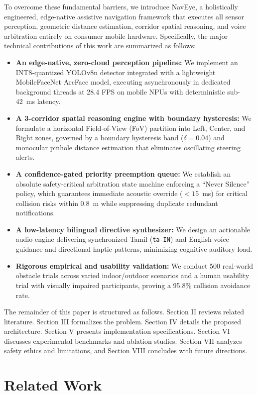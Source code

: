 \documentclass[conference]{IEEEtran}
\begin{document}
To overcome these fundamental barriers, we introduce NavEye, a holistically engineered, edge-native assistive navigation framework that executes all sensor perception, geometric distance estimation, corridor spatial reasoning, and voice arbitration entirely on consumer mobile hardware. Specifically, the major technical contributions of this work are summarized as follows:
\begin{itemize}
    \item \textbf{An edge-native, zero-cloud perception pipeline:} We implement an INT8-quantized YOLOv8n detector integrated with a lightweight MobileFaceNet ArcFace model, executing asynchronously in dedicated background threads at 28.4 FPS on mobile NPUs with deterministic sub-42~ms latency.
    \item \textbf{A 3-corridor spatial reasoning engine with boundary hysteresis:} We formulate a horizontal Field-of-View (FoV) partition into Left, Center, and Right zones, governed by a boundary hysteresis band ($\delta = 0.04$) and monocular pinhole distance estimation that eliminates oscillating steering alerts.
    \item \textbf{A confidence-gated priority preemption queue:} We establish an absolute safety-critical arbitration state machine enforcing a ``Never Silence'' policy, which guarantees immediate acoustic override ($<15$~ms) for critical collision risks within 0.8~m while suppressing duplicate redundant notifications.
    \item \textbf{A low-latency bilingual directive synthesizer:} We design an actionable audio engine delivering synchronized Tamil (\texttt{ta-IN}) and English voice guidance and directional haptic patterns, minimizing cognitive auditory load.
    \item \textbf{Rigorous empirical and usability validation:} We conduct 500 real-world obstacle trials across varied indoor/outdoor scenarios and a human usability trial with visually impaired participants, proving a 95.8\% collision avoidance rate.
\end{itemize}

The remainder of this paper is structured as follows. Section II reviews related literature. Section III formalizes the problem. Section IV details the proposed architecture. Section V presents implementation specifications. Section VI discusses experimental benchmarks and ablation studies. Section VII analyzes safety ethics and limitations, and Section VIII concludes with future directions.

\section{Related Work}
\end{document}

